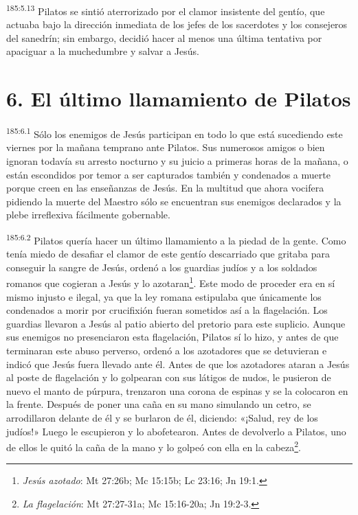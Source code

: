 \par
\textsuperscript{185:5.13} Pilatos se sintió aterrorizado por el clamor insistente del gentío, que actuaba bajo la dirección inmediata de los jefes de los sacerdotes y los consejeros del sanedrín; sin embargo, decidió hacer al menos una última tentativa por apaciguar a la muchedumbre y salvar a Jesús.

\section*{6. El último llamamiento de Pilatos}
\par
\textsuperscript{185:6.1} Sólo los enemigos de Jesús participan en todo lo que está sucediendo este viernes por la mañana temprano ante Pilatos. Sus numerosos amigos o bien ignoran todavía su arresto nocturno y su juicio a primeras horas de la mañana, o están escondidos por temor a ser capturados también y condenados a muerte porque creen en las enseñanzas de Jesús. En la multitud que ahora vocifera pidiendo la muerte del Maestro sólo se encuentran sus enemigos declarados y la plebe irreflexiva fácilmente gobernable.

\par
\textsuperscript{185:6.2} Pilatos quería hacer un último llamamiento a la piedad de la gente. Como tenía miedo de desafiar el clamor de este gentío descarriado que gritaba para conseguir la sangre de Jesús, ordenó a los guardias judíos y a los soldados romanos que cogieran a Jesús y lo azotaran\footnote{\textit{Jesús azotado}: Mt 27:26b; Mc 15:15b; Lc 23:16; Jn 19:1.}. Este modo de proceder era en sí mismo injusto e ilegal, ya que la ley romana estipulaba que únicamente los condenados a morir por crucifixión fueran sometidos así a la flagelación. Los guardias llevaron a Jesús al patio abierto del pretorio para este suplicio. Aunque sus enemigos no presenciaron esta flagelación, Pilatos sí lo hizo, y antes de que terminaran este abuso perverso, ordenó a los azotadores que se detuvieran e indicó que Jesús fuera llevado ante él. Antes de que los azotadores ataran a Jesús al poste de flagelación y lo golpearan con sus látigos de nudos, le pusieron de nuevo el manto de púrpura, trenzaron una corona de espinas y se la colocaron en la frente. Después de poner una caña en su mano simulando un cetro, se arrodillaron delante de él y se burlaron de él, diciendo: «¡Salud, rey de los judíos!» Luego le escupieron y lo abofetearon. Antes de devolverlo a Pilatos, uno de ellos le quitó la caña de la mano y lo golpeó con ella en la cabeza\footnote{\textit{La flagelación}: Mt 27:27-31a; Mc 15:16-20a; Jn 19:2-3.}.

